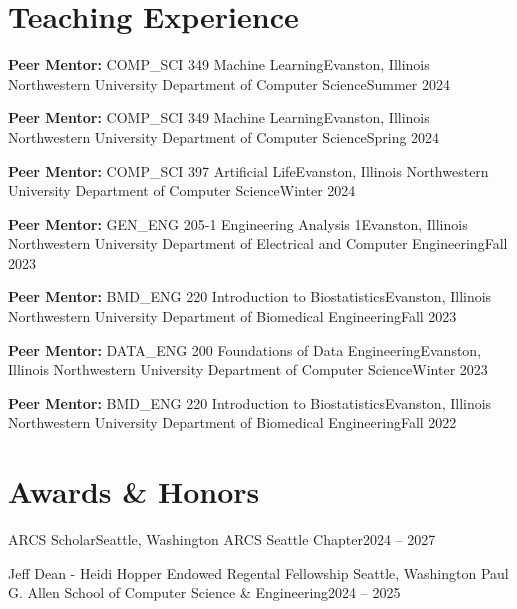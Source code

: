 \documentclass{cv}
\begin{document}
\resumeSubHeadingListEnd

\section{Teaching Experience}
\vspace{3pt}
\resumeSubHeadingListStart

\resumeSubheading
{\textbf{Peer Mentor:} COMP\_SCI 349 Machine Learning}{Evanston, Illinois}
{Northwestern University Department of Computer Science}{Summer 2024}

\resumeSubheading
{\textbf{Peer Mentor:} COMP\_SCI 349 Machine Learning}{Evanston, Illinois}
{Northwestern University Department of Computer Science}{Spring 2024}

\resumeSubheading
{\textbf{Peer Mentor:} COMP\_SCI 397 Artificial Life}{Evanston, Illinois}
{Northwestern University Department of Computer Science}{Winter 2024}

\resumeSubheading
{\textbf{Peer Mentor:} GEN\_ENG 205-1 Engineering Analysis 1}{Evanston, Illinois}
{Northwestern University Department of Electrical and Computer Engineering}{Fall 2023}

\resumeSubheading
{\textbf{Peer Mentor:} BMD\_ENG 220 Introduction to Biostatistics}{Evanston, Illinois}
{Northwestern University Department of Biomedical Engineering}{Fall 2023}

\resumeSubheading
{\textbf{Peer Mentor:} DATA\_ENG 200 Foundations of Data Engineering}{Evanston, Illinois}
{Northwestern University Department of Computer Science}{Winter 2023}

\resumeSubheading
{\textbf{Peer Mentor:} BMD\_ENG 220 Introduction to Biostatistics}{Evanston, Illinois}
{Northwestern University Department of Biomedical Engineering}{Fall 2022}

\resumeSubHeadingListEnd



\section{Awards \& Honors}
\vspace{3pt}
\resumeSubHeadingListStart

\resumeSubheading
{ARCS Scholar}{Seattle, Washington}
{ARCS Seattle Chapter}{2024 – 2027}

\resumeSubheading
{Jeff Dean - Heidi Hopper Endowed Regental Fellowship }{Seattle, Washington}
{Paul G. Allen School of Computer Science \& Engineering}{2024 – 2025}
\end{document}
